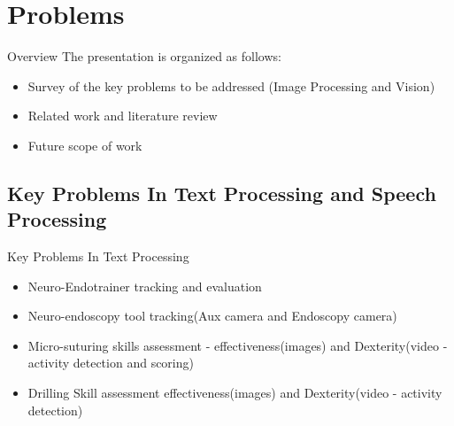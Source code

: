 \documentclass{beamer}
\begin{document}


\section{Problems}

\begin{frame}{Overview}
\Large The presentation is organized as follows:
\begin{itemize}
  \item \Large Survey of the key problems to be addressed (Image Processing and Vision)
  \item \Large Related work and literature review
  \item \Large Future scope of work
\end{itemize}

\vskip 1cm


\end{frame}

\subsection{Key Problems In Text Processing and Speech Processing}

\begin{frame}{Key Problems In Text Processing}

\begin{itemize}
\item Neuro-Endotrainer tracking and evaluation
\item Neuro-endoscopy tool tracking(Aux camera and Endoscopy camera)
\item  Micro-suturing skills assessment - effectiveness(images) and Dexterity(video - activity detection and scoring)
\item Drilling Skill assessment effectiveness(images) and Dexterity(video - activity detection)
\end{itemize}


\end{frame}
\end{document}
